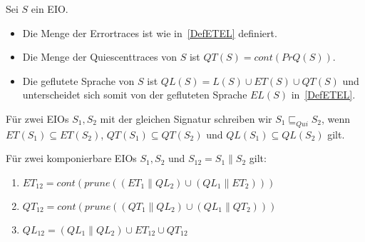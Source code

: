 \begin{Def}
  \label{DefQTQL}
  Sei $S$ ein EIO.
  \begin{itemize}
    \item Die Menge der Errortraces ist wie in~\ref{DefETEL} definiert.
    \item Die Menge der Quiescenttraces von $S$ ist $QT(S) = cont(PrQ(S))$.
    \item Die geflutete Sprache von $S$ ist $QL(S)=L(S)\cup ET(S)\cup QT(S)$
      und unterscheidet sich somit von der gefluteten Sprache $EL(S)$
      in~\ref{DefETEL}.
  \end{itemize}
  Für zwei EIOs $S_1, S_2$ mit der gleichen Signatur schreiben wir
  $S_1\sqsubseteq _{Qui} S_2$, wenn $ET(S_1)\subseteq ET(S_2)$,
  $QT(S_1)\subseteq QT(S_2)$ und $QL(S_1)\subseteq QL(S_2)$ gilt.
\end{Def}

\begin{satz}
  Für zwei komponierbare EIOs $S_1, S_2$ und $S_{12} = S_1\|S_2$ gilt:
  \begin{enumerate}
    \item $ET_{12} = cont(prune((ET_1\|QL_2)\cup (QL_1\|ET_2)))$
    \item $QT_{12} = cont(prune((QT_1\|QL_2)\cup (QL_1\|QT_2)))$%
    \item $QL_{12} = (QL_1\|QL_2)\cup ET_{12}\cup QT_{12}$%
  \end{enumerate}
\end{satz}

